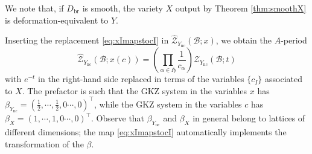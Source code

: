 \documentclass[12pt,a4paper,oneside]{amsart}
\numberwithin{equation}{section}
\theoremstyle{definition}
\theoremstyle{remark}
\newcommand{\mz}{\mathcal{Z}}
\newcommand{\Br}{\mathcal{B}}
\newcommand{\Ync}{Y_{\mathrm{nc}}}
\newcommand{\pz}{\widehat{\mathcal{Z}}}
\begin{document}
We note that, if $D_{\mathrm{br}}$ is smooth, the variety $X$ output by Theorem \ref{thm:smoothX} is deformation-equivalent to $Y$.\par
    Inserting the replacement \eqref{eq:xImapstocI} in $\pz_{\Ync} (\Br; x)$, we obtain the $A$-period 
    \begin{equation*}
        \pz_{\Ync} (\Br; x (c) ) =  \left( \prod_{\alpha \in \mathfrak{H}} \frac{1}{c_{\alpha}} \right) \mz_{\Ync} (\Br; t) 
    \end{equation*}
    with $e^{-t}$ in the right-hand side replaced in terms of the variables $\{ c_I \}$ associated to $X$. The prefactor is such that the GKZ system in the variables $x$ has $\beta_{\Ync} = \left( \frac{1}{2} , \cdots , \frac{1}{2} , 0 \cdots , 0\right)^{\top}$, while the GKZ system in the variables $c$ has $\beta_X = \left( 1 , \cdots , 1 , 0 \cdots , 0\right)^{\top}$. Observe that $\beta_{\Ync} $ and $\beta_{X}$ in general belong to lattices of different dimensions; the map \eqref{eq:xImapstocI} automatically implements the transformation of the $\beta$.\par
    
\end{document}
